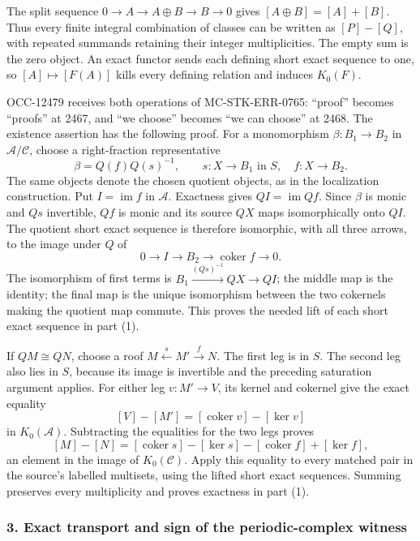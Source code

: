 The split sequence \(0\to A\to A\oplus B\to B\to0\) gives \([A\oplus B]=[A]+[B]\). Thus every finite integral combination of classes can be written as \([P]-[Q]\), with repeated summands retaining their integer multiplicities. The empty sum is the zero object. An exact functor sends each defining short exact sequence to one, so \([A]\mapsto[F(A)]\) kills every defining relation and induces \(K_0(F)\).

OCC-12479 receives both operations of MC-STK-ERR-0765: ``proof'' becomes ``proofs'' at 2467, and ``we choose'' becomes ``we can choose'' at 2468. The existence assertion has the following proof. For a monomorphism \(\beta:B_1\to B_2\) in \(\mathcal A/\mathcal C\), choose a right-fraction representative \[
\beta=Q(f)Q(s)^{-1},\qquad s:X\to B_1\text{ in }S,\quad f:X\to B_2.
\] The same objects denote the chosen quotient objects, as in the localization construction. Put \(I=\operatorname{im}f\) in \(\mathcal A\). Exactness gives \(QI=\operatorname{im}Qf\). Since \(\beta\) is monic and \(Qs\) invertible, \(Qf\) is monic and its source \(QX\) maps isomorphically onto \(QI\). The quotient short exact sequence is therefore isomorphic, with all three arrows, to the image under \(Q\) of \[
0\longrightarrow I\longrightarrow B_2
\longrightarrow\operatorname{coker}f\longrightarrow0.
\] The isomorphism of first terms is \(B_1\xrightarrow{(Qs)^{-1}}QX\to QI\); the middle map is the identity; the final map is the unique isomorphism between the two cokernels making the quotient map commute. This proves the needed lift of each short exact sequence in part (1).

If \(QM\cong QN\), choose a roof \(M\xleftarrow{s}M'\xrightarrow{f}N\). The first leg is in \(S\). The second leg also lies in \(S\), because its image is invertible and the preceding saturation argument applies. For either leg \(v:M'\to V\), its kernel and cokernel give the exact equality \[
[V]-[M']=[\operatorname{coker}v]-[\ker v]
\] in \(K_0(\mathcal A)\). Subtracting the equalities for the two legs proves \[
[M]-[N]
=[\operatorname{coker}s]-[\ker s]
-[\operatorname{coker}f]+[\ker f],
\] an element in the image of \(K_0(\mathcal C)\). Apply this equality to every matched pair in the source's labelled multisets, using the lifted short exact sequences. Summing preserves every multiplicity and proves exactness in part (1).

\subsubsection{3. Exact transport and sign of the periodic-complex witness}\label{exact-transport-and-sign-of-the-periodic-complex-witness}

